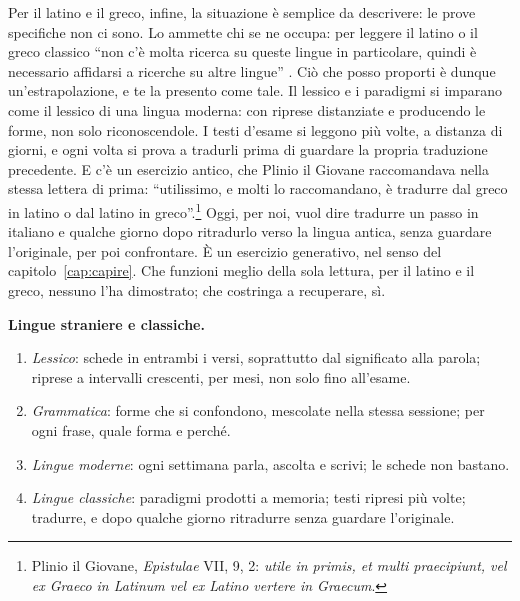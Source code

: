 Per il latino e il greco, infine, la situazione è semplice da
descrivere: le prove specifiche non ci sono. Lo ammette chi se ne
occupa: per leggere il latino o il greco classico \enquote{non c'è
molta ricerca su queste lingue in particolare, quindi è necessario
affidarsi a ricerche su altre lingue} \parencite{wegenhart2015}. Ciò
che posso proporti è dunque un'estrapolazione, e te la presento come
tale. Il lessico e i paradigmi si imparano come il lessico di una
lingua moderna: con riprese distanziate e producendo le forme, non solo
riconoscendole. I testi d'esame si leggono più volte, a distanza di
giorni, e ogni volta si prova a tradurli prima di guardare la propria
traduzione precedente. E c'è un esercizio antico, che Plinio il
Giovane raccomandava nella stessa lettera di prima:
\enquote{utilissimo, e molti lo raccomandano, è tradurre dal greco in
latino o dal latino in greco}.\footnote{Plinio il Giovane,
\emph{Epistulae} VII, 9, 2: \emph{utile in primis, et multi praecipiunt,
vel ex Graeco in Latinum vel ex Latino vertere in Graecum}.} Oggi,
per noi, vuol dire tradurre un passo in italiano e qualche giorno dopo
ritradurlo verso la lingua antica, senza guardare l'originale, per poi
confrontare. È un esercizio generativo, nel senso del
capitolo~\ref{cap:capire}. Che funzioni meglio della sola lettura, per
il latino e il greco, nessuno l'ha dimostrato; che costringa a
recuperare, sì.

\begin{inpratica}
\textbf{Lingue straniere e classiche.}
\begin{enumerate}
  \item \emph{Lessico}: schede in entrambi i versi, soprattutto dal
        significato alla parola; riprese a intervalli crescenti, per
        mesi, non solo fino all'esame.
  \item \emph{Grammatica}: forme che si confondono, mescolate nella
        stessa sessione; per ogni frase, quale forma e perché.
  \item \emph{Lingue moderne}: ogni settimana parla, ascolta e scrivi;
        le schede non bastano.
  \item \emph{Lingue classiche}: paradigmi prodotti a memoria; testi
        ripresi più volte; tradurre, e dopo qualche giorno ritradurre
        senza guardare l'originale.
\end{enumerate}
\end{inpratica}

